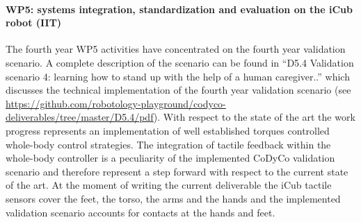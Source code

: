 
\paragraph*{WP5: systems integration, standardization and evaluation on the iCub robot (IIT)}

The fourth year WP5 activities have concentrated on the fourth year validation scenario. A complete description of the scenario can be found in ``D5.4 Validation scenario 4: learning how to stand up with the help of a human caregiver..'' which discusses the technical implementation of the fourth year validation scenario (see \url{https://github.com/robotology-playground/codyco-deliverables/tree/master/D5.4/pdf}). With respect to the state of the art the work progress represents an implementation of well established torques controlled whole-body control strategies. The integration of tactile feedback within the whole-body controller is a peculiarity of the implemented CoDyCo validation scenario and therefore represent a step forward with respect to the current state of the art. At the moment of writing the current deliverable the iCub tactile sensors cover the feet, the torso, the arms and the hands and the implemented validation scenario accounts for contacts at the hands and feet.